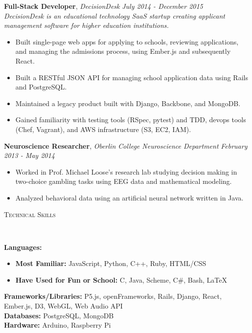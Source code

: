 \documentclass[9pt]{article}
\newenvironment{changemargin}[2]{%
  \begin{list}{}{%
    \setlength{\topsep}{0pt}%
    \setlength{\leftmargin}{#1}%
    \setlength{\rightmargin}{#2}%
    \setlength{\listparindent}{\parindent}%
    \setlength{\itemindent}{\parindent}%
    \setlength{\parsep}{\parskip}%
  }%
  \item[]}{\end{list}
}
\newcommand{\lineover}{
	\begin{changemargin}{-0.05in}{-0.05in}
		\vspace*{-8pt}
		\hrulefill \\
		\vspace*{-2pt}
	\end{changemargin}
}
\newcommand{\header}[1]{
	\begin{changemargin}{-0.5in}{-0.5in}
		\scshape{#1}\\
  	\lineover
	\end{changemargin}
}
\newenvironment{body} {
	\vspace*{-16pt}
	\begin{changemargin}{-0.25in}{-0.5in}
  }	
	{\end{changemargin}
}
\begin{document}
\begin{body}
	\textbf{Full-Stack Developer}, \emph{DecisionDesk} \hfill \emph{July 2014 - December 2015}\\
	\emph{DecisionDesk is an educational technology SaaS startup creating applicant management software for higher education institutions.}
	\vspace*{-4pt}
	\begin{itemize} \itemsep -0pt  %
		\item Built single-page web apps for applying to schools, reviewing applications, and managing the admissions process, using Ember.js and subsequently React.
		\item Built a RESTful JSON API for managing school application data using Rails and PostgreSQL.
		\item Maintained a legacy product built with Django, Backbone, and MongoDB.
		\item Gained familiarity with testing tools (RSpec, pytest) and TDD, devops tools (Chef, Vagrant),  and AWS infrastructure (S3, EC2, IAM).
	\end{itemize}

	\textbf{Neuroscience Researcher}, \emph{Oberlin College Neuroscience Department} \hfill 				\emph{February 2013 - May 2014}\\
         \vspace*{-4pt}
         \begin{itemize} \itemsep -0pt  %
                \item Worked in Prof. Michael Loose's research lab studying decision making in two-choice gambling tasks using EEG data and mathematical modeling.
                \item Analyzed behavioral data using an artificial neural network written in Java.
        \end{itemize}
\end{body}
\smallskip

\header{Technical Skills}

\begin{body}
	\vspace{14pt}
	\textbf{Languages:}{} 
		\begin{itemize} \itemsep -0pt  %
			\item \textbf{Most Familiar:} JavaScript, Python, C++, Ruby, HTML/CSS
			\item \textbf{Have Used for Fun or School:} C, Java, Scheme, C\#, Bash, \LaTeX \\
		\end{itemize}
	\smallskip
	\textbf{Frameworks/Libraries:}{} P5.js, openFrameworks, Rails, Django, React, Ember.js, D3, WebGL, Web Audio API \\
	\smallskip
	\textbf{Databases:}{} PostgreSQL, MongoDB \\
	\smallskip
	\textbf{Hardware:}{} Arduino, Raspberry Pi \\
\end{body}
\end{document}
